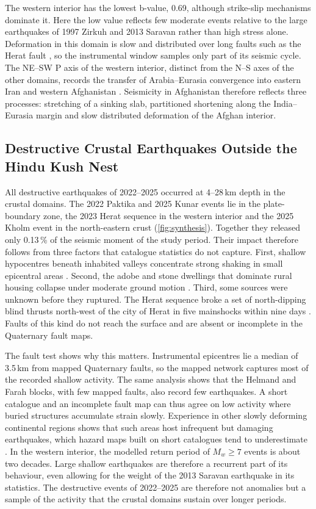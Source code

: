 \documentclass[11pt]{article}
\begin{document}
The western interior has the lowest b-value, 0.69, although strike-slip mechanisms
dominate it. Here the low value reflects few moderate events relative to the large
earthquakes of 1997 Zirkuh and 2013 Saravan rather than high stress alone.
Deformation in this domain is slow and distributed over long faults such as the
Herat fault \cite{Wheeler2005, Ruleman2007, Walker2004}, so the instrumental window
samples only part of its seismic cycle. The NE--SW P axis of the western interior,
distinct from the N--S axes of the other domains, records the transfer of
Arabia--Eurasia convergence into eastern Iran and western Afghanistan
\cite{Vernant2004, Walker2004}. Seismicity in Afghanistan therefore reflects three
processes: stretching of a sinking slab, partitioned shortening along the
India--Eurasia margin and slow distributed deformation of the Afghan interior.

\subsection{Destructive Crustal Earthquakes Outside the Hindu Kush Nest}
All destructive earthquakes of 2022--2025 occurred at 4--28\,km depth in the
crustal domains. The 2022 Paktika and 2025 Kunar events lie in the plate-boundary
zone, the 2023 Herat sequence in the western interior and the 2025 Kholm event in
the north-eastern crust (\cref{fig:synthesis}). Together they released only 0.13\,\%
of the seismic moment of the study period. Their impact therefore follows from three
factors that catalogue statistics do not capture. First, shallow hypocentres beneath
inhabited valleys concentrate strong shaking in small epicentral areas
\cite{Jahed2024}. Second, the adobe and stone dwellings that dominate rural housing
collapse under moderate ground motion \cite{Akhundzadah2025, WorldBank2024}. Third,
some sources were unknown before they ruptured. The Herat sequence broke a set of
north-dipping blind thrusts north-west of the city of Herat in five mainshocks
within nine days \cite{Zhao2025, Fu2025, Xu2025, Zhong2026, Toker2026}. Faults of
this kind do not reach the surface and are absent or incomplete in the Quaternary
fault maps.

The fault test shows why this matters. Instrumental epicentres lie a median of
3.5\,km from mapped Quaternary faults, so the mapped network captures most of the
recorded shallow activity. The same analysis shows that the Helmand and Farah blocks,
with few mapped faults, also record few earthquakes. A short catalogue and an
incomplete fault map can thus agree on low activity where buried structures
accumulate strain slowly. Experience in other slowly deforming continental regions
shows that such areas host infrequent but damaging earthquakes, which hazard maps
built on short catalogues tend to underestimate \cite{Stein2012, Liu2016, Calais2016,
England2011}. In the western interior, the modelled return period of $M_w \geq 7$
events is about two decades. Large shallow earthquakes are therefore a recurrent
part of its behaviour, even allowing for the weight of the 2013 Saravan earthquake
in its statistics. The destructive events of 2022--2025 are therefore not anomalies
but a sample of the activity that the crustal domains sustain over longer periods.
\end{document}
